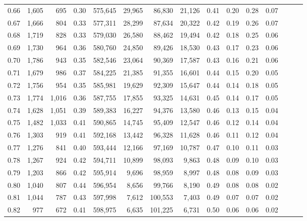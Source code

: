 \begin{tabular}{rrrrrrrrrrrrrrr}
0.66 &   1,605 &    695 &  0.30 &  575,645 &   29,965 &   86,830 &   21,126 &  0.41 &  0.20 &  0.28 &      0.07 \\
0.67 &   1,666 &    804 &  0.33 &  577,311 &   28,299 &   87,634 &   20,322 &  0.42 &  0.19 &  0.26 &      0.07 \\
0.68 &   1,719 &    828 &  0.33 &  579,030 &   26,580 &   88,462 &   19,494 &  0.42 &  0.18 &  0.25 &      0.06 \\
0.69 &   1,730 &    964 &  0.36 &  580,760 &   24,850 &   89,426 &   18,530 &  0.43 &  0.17 &  0.23 &      0.06 \\
0.70 &   1,786 &    943 &  0.35 &  582,546 &   23,064 &   90,369 &   17,587 &  0.43 &  0.16 &  0.21 &      0.06 \\
0.71 &   1,679 &    986 &  0.37 &  584,225 &   21,385 &   91,355 &   16,601 &  0.44 &  0.15 &  0.20 &      0.05 \\
0.72 &   1,756 &    954 &  0.35 &  585,981 &   19,629 &   92,309 &   15,647 &  0.44 &  0.14 &  0.18 &      0.05 \\
0.73 &   1,774 &  1,016 &  0.36 &  587,755 &   17,855 &   93,325 &   14,631 &  0.45 &  0.14 &  0.17 &      0.05 \\
0.74 &   1,628 &  1,051 &  0.39 &  589,383 &   16,227 &   94,376 &   13,580 &  0.46 &  0.13 &  0.15 &      0.04 \\
0.75 &   1,482 &  1,033 &  0.41 &  590,865 &   14,745 &   95,409 &   12,547 &  0.46 &  0.12 &  0.14 &      0.04 \\
0.76 &   1,303 &    919 &  0.41 &  592,168 &   13,442 &   96,328 &   11,628 &  0.46 &  0.11 &  0.12 &      0.04 \\
0.77 &   1,276 &    841 &  0.40 &  593,444 &   12,166 &   97,169 &   10,787 &  0.47 &  0.10 &  0.11 &      0.03 \\
0.78 &   1,267 &    924 &  0.42 &  594,711 &   10,899 &   98,093 &    9,863 &  0.48 &  0.09 &  0.10 &      0.03 \\
0.79 &   1,203 &    866 &  0.42 &  595,914 &    9,696 &   98,959 &    8,997 &  0.48 &  0.08 &  0.09 &      0.03 \\
0.80 &   1,040 &    807 &  0.44 &  596,954 &    8,656 &   99,766 &    8,190 &  0.49 &  0.08 &  0.08 &      0.02 \\
0.81 &   1,044 &    787 &  0.43 &  597,998 &    7,612 &  100,553 &    7,403 &  0.49 &  0.07 &  0.07 &      0.02 \\
0.82 &     977 &    672 &  0.41 &  598,975 &    6,635 &  101,225 &    6,731 &  0.50 &  0.06 &  0.06 &      0.02 \\

\end{tabular}
